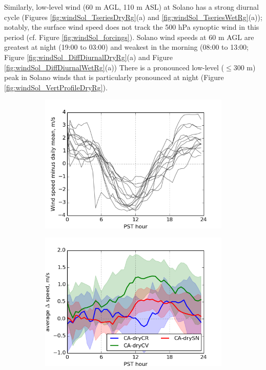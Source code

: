Similarly, low-level wind (60 m AGL, 110 m ASL) at Solano has a strong diurnal cycle (Figures \ref{fig:windSol_TseriesDryRg}(a) and \ref{fig:windSol_TseriesWetRg}(a)); notably, the surface wind speed does not track the 500 hPa synoptic wind in this period (cf. Figure \ref{fig:windSol_forcings}).  Solano wind speeds at 60 m AGL are greatest at night (19:00 to 03:00) and weakest in the morning (08:00 to 13:00; Figure \ref{fig:windSol_DiffDiurnalDryRg}(a) and Figure \ref{fig:windSol_DiffDiurnalWetRg}(a))  There is a pronounced low-level ($\le$300 m) peak in Solano winds that is particularly pronounced at night (Figure \ref{fig:windSol_VertProfileDryRg}).

\begin{figure}[here]
\begin{subfigure}{0.5\textwidth}
\includegraphics[width=1\textwidth]{ch3-wind/img/solano_controlwind_minusmean_CA0pt25_d02_level0.png}
\caption{}
\end{subfigure}
\begin{subfigure}{0.5\textwidth}
\includegraphics[width=1\textwidth]{ch3-wind/img/solano_diurnalwind_dry_regions_d02_level0.png}

\end{subfigure}
\end{figure}

